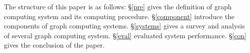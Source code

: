 \documentclass{acm_proc_article}
\newcommand{\chref}[1]{\S\ref{#1}}
\begin{document}
The structure of this paper is as follows: \chref{pre} gives the definition
of graph computing system and its computing procedure. \chref{component}
introduce the components of graph computing systems. \chref{systems} gives
a survey and analysis of several graph computing system. \chref{eval} evaluated
system performance. \chref{con} gives the conclusion of the paper.













\end{document}
